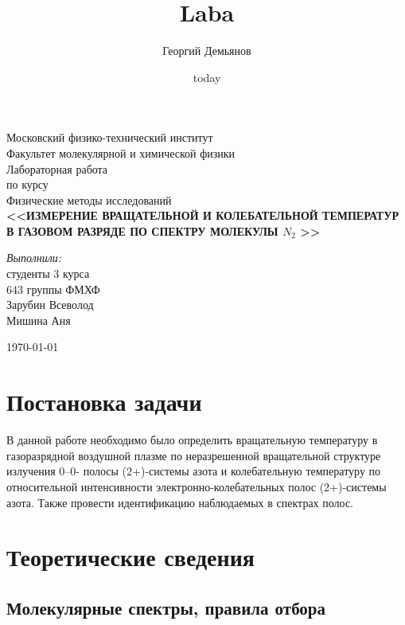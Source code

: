 \documentclass[a4paper,12pt]{article}
\title{Laba}
\author{Георгий Демьянов}
\date{today}
\begin{document}
\begin{titlepage}
\begin{center} 
 
\large Московский физико-технический институт\\
Факультет молекулярной и химической физики\\
\vspace{7cm}
\Large Лабораторная работа \\по курсу \\ Физические методы исследований\\
\textbf{\Large <<ИЗМЕРЕНИЕ ВРАЩАТЕЛЬНОЙ И КОЛЕБАТЕЛЬНОЙ ТЕМПЕРАТУР В ГАЗОВОМ РАЗРЯДЕ ПО СПЕКТРУ МОЛЕКУЛЫ $N_2$ >>}\\
\end{center} 

\vspace{5cm}
{\par 
	\raggedleft \large 
	\emph{Выполнили:}\\ 
	студенты 3 курса\\ 
	643 группы ФМХФ\\ 
	Зарубин Всеволод  \\ 
	Мишина Аня 
\par}
\begin{center}
\vfill \today
\end{center}
\end{titlepage}
\newpage
\setcounter{page}{2}

\newpage
	\section{Постановка задачи}
	В данной работе необходимо было определить вращательную температуру в газоразрядной воздушной плазме по неразрешенной вращательной структуре
излучения 0–0- полосы (2+)-системы азота и колебательную температуру по относительной интенсивности
электронно-колебательных полос (2+)-системы азота. Также провести идентификацию наблюдаемых в спектрах полос. 
	\section{Теоретические сведения}
	
	\subsection{Молекулярные спектры, правила отбора}
	
\end{document}
